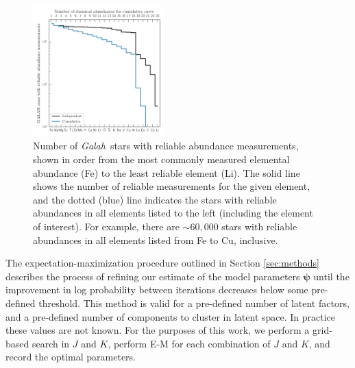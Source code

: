 \documentclass[twocolumn]{aastex61}
\newcommand\teff{T_{\rm eff}}
\newcommand\logg{\log{g}}
\newcommand{\project}[1]{\textsl{#1}}
\newcommand{\Galah}{\project{Galah}}
\newcommand{\todo}[1]{\textcolor{red}{#1}}
\newcommand{\vect}[1]{\boldsymbol{\mathbf{#1}}}
\renewcommand{\vec}[1]{\vect{#1}}
\begin{document}
\begin{figure}
	\includegraphics[width=0.45\textwidth]{experiments/galah-abundances.png}
    \caption{Number of \Galah\ stars with reliable abundance measurements,
    		 shown in order from the most commonly measured elemental abundance
		 	 (Fe) to the least reliable element (Li). The solid line
			 shows the number of reliable measurements for the given element,
			 and the dotted (blue) line indicates the stars with reliable
			 abundances in all elements listed to the left (including the
			 element of interest). For example, there are $\sim60,000$
			 stars with reliable abundances in all elements listed from
			 Fe to Cu, inclusive.}
    \label{fig:galah-abundances}
\end{figure}

The expectation-maximization procedure outlined in Section \ref{sec:methods} describes 
the process of refining our estimate of the model parameters $\vec\psi$ until
the improvement in log probability between iterations decreases below some
pre-defined threshold. This method is valid for a pre-defined number of latent
factors, and a pre-defined number of components to cluster in latent space.
In practice these values are not known. For the purposes of this work, we 
perform a grid-based search in $J$ and $K$, perform E-M for each combination of
$J$ and $K$, and record the optimal parameters.
\end{document}
